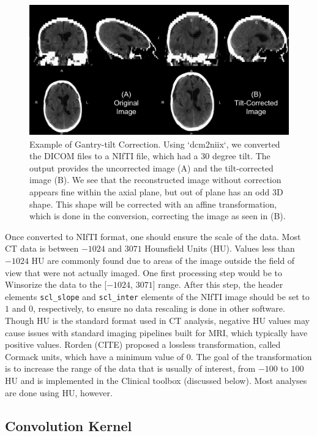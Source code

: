 \documentclass[]{elsarticle} %
\begin{document}
\begin{figure}
\includegraphics[width=1\linewidth]{index_files/figure-latex/gantry-1} \caption{Example of Gantry-tilt Correction.  Using `dcm2niix`, we converted the DICOM files to a NIfTI file, which had a 30 degree tilt.  The output provides the uncorrected image (A) and the tilt-corrected image (B).  We see that the reconstructed image without correction appears fine within the axial plane, but out of plane has an odd 3D shape.  This shape will be corrected with an affine transformation, which is done in the conversion, correcting the image as seen in (B). }\label{fig:gantry}
\end{figure}

Once converted to NIfTI format, one should ensure the scale of the data. Most CT data is between \(-1024\) and \(3071\) Hounsfield Units (HU). Values less than \(-1024\) HU are commonly found due to areas of the image outside the field of view that were not actually imaged. One first processing step would be to Winsorize the data to the {[}\(-1024\), \(3071\){]} range. After this step, the header elements \texttt{scl\_slope} and \texttt{scl\_inter} elements of the NIfTI image should be set to \(1\) and \(0\), respectively, to ensure no data rescaling is done in other software. Though HU is the standard format used in CT analysis, negative HU values may cause issues with standard imaging pipelines built for MRI, which typically have positive values. Rorden (CITE) proposed a lossless transformation, called Cormack units, which have a minimum value of \(0\). The goal of the transformation is to increase the range of the data that is usually of interest, from \(-100\) to \(100\)HU and is implemented in the Clinical toolbox (discussed below). Most analyses are done using HU, however.

\hypertarget{convolution-kernel}{%
\subsection{Convolution Kernel}\label{convolution-kernel}}
\end{document}
